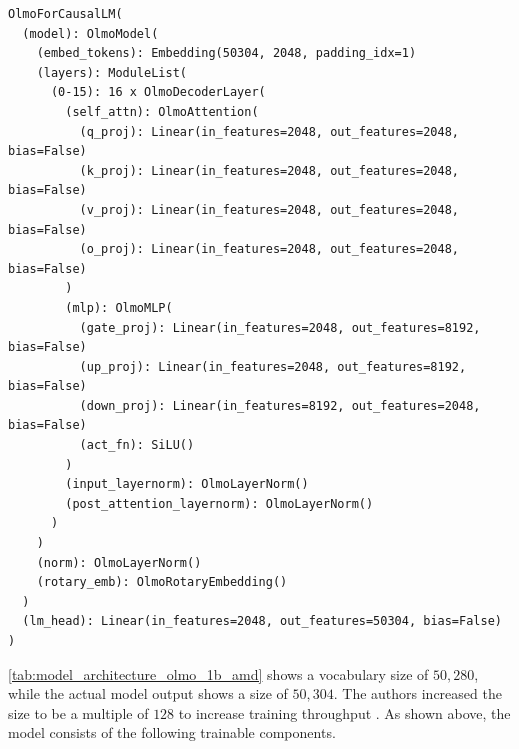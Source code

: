 \begin{verbatim}
OlmoForCausalLM(
  (model): OlmoModel(
    (embed_tokens): Embedding(50304, 2048, padding_idx=1)
    (layers): ModuleList(
      (0-15): 16 x OlmoDecoderLayer(
        (self_attn): OlmoAttention(
          (q_proj): Linear(in_features=2048, out_features=2048, bias=False)
          (k_proj): Linear(in_features=2048, out_features=2048, bias=False)
          (v_proj): Linear(in_features=2048, out_features=2048, bias=False)
          (o_proj): Linear(in_features=2048, out_features=2048, bias=False)
        )
        (mlp): OlmoMLP(
          (gate_proj): Linear(in_features=2048, out_features=8192, bias=False)
          (up_proj): Linear(in_features=2048, out_features=8192, bias=False)
          (down_proj): Linear(in_features=8192, out_features=2048, bias=False)
          (act_fn): SiLU()
        )
        (input_layernorm): OlmoLayerNorm()
        (post_attention_layernorm): OlmoLayerNorm()
      )
    )
    (norm): OlmoLayerNorm()
    (rotary_emb): OlmoRotaryEmbedding()
  )
  (lm_head): Linear(in_features=2048, out_features=50304, bias=False)
)
\end{verbatim}
\autoref{tab:model_architecture_olmo_1b_amd} shows a vocabulary size of $50{,}280$, while the actual model output shows a size of $50{,}304$. The authors increased the size to be a multiple of $128$ to increase training throughput \cite{DBLP:conf/acl/GroeneveldBWBKT24}. As shown above, the model consists of the following trainable components.
